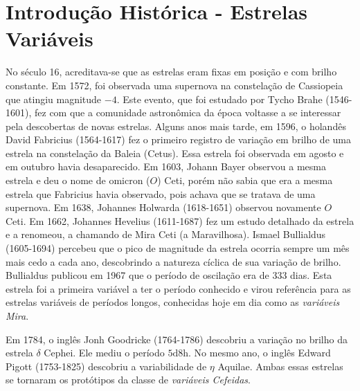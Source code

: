 


\section{Introdução Histórica - Estrelas Variáveis}


No século 16, acreditava-se que as estrelas eram fixas em posição e com brilho constante. Em 1572, foi observada uma supernova na constelação de Cassiopeia que atingiu magnitude $-4$. Este evento, que foi estudado por Tycho Brahe (1546-1601), fez com que a comunidade astronômica da época voltasse a se interessar pela descobertas de novas estrelas. Alguns anos mais tarde, em 1596, o holandês David Fabricius (1564-1617) fez o primeiro registro de variação em brilho de uma estrela na constelação da Baleia (Cetus).  Essa estrela foi observada em agosto e em outubro havia desaparecido. Em 1603, Johann Bayer observou a mesma estrela e deu o nome de omicron ($O$) Ceti, porém não sabia que era a mesma estrela que Fabricius havia observado, pois achava que se tratava de uma supernova. Em 1638, Johannes Holwarda (1618-1651) observou novamente $O$ Ceti. Em 1662, Johannes Hevelius (1611-1687) fez um estudo detalhado da estrela e a renomeou, a chamando de Mira Ceti (a Maravilhosa). Ismael Bullialdus (1605-1694) percebeu que o pico de magnitude da estrela ocorria sempre um mês mais cedo a cada ano, descobrindo a natureza cíclica de sua variação de brilho. Bullialdus publicou em 1967 que o período de oscilação era de 333 dias. Esta estrela foi a primeira variável a ter o período conhecido e virou referência para as estrelas variáveis de períodos longos, conhecidas hoje em dia como as \textit{variáveis Mira}.

Em 1784, o inglês Jonh Goodricke (1764-1786) descobriu a variação no brilho da estrela $\delta$ Cephei. Ele mediu o período $5\si{\day}8\si{\hour}$. No mesmo ano, o inglês Edward Pigott (1753-1825) descobriu a variabilidade de $\eta$ Aquilae. Ambas essas estrelas se tornaram os protótipos da classe de \textit{variáveis Cefeidas}.

